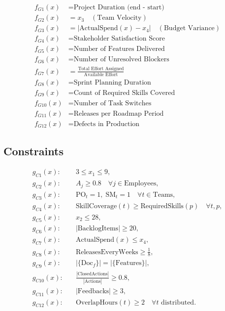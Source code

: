 \documentclass{article}
\begin{document}
\[
\begin{aligned}
f_{G1}(x) &= \text{Project Duration (end - start)}\\
f_{G2}(x) &= x_3 \quad(\text{Team Velocity})\\
f_{G3}(x) &= \bigl|\text{ActualSpend}(x) - x_4\bigr| \quad(\text{Budget Variance})\\
f_{G4}(x) &= \text{Stakeholder Satisfaction Score}\\
f_{G5}(x) &= \text{Number of Features Delivered}\\
f_{G6}(x) &= \text{Number of Unresolved Blockers}\\
f_{G7}(x) &= \frac{\text{Total Effort Assigned}}{\text{Available Effort}}\\
f_{G8}(x) &= \text{Sprint Planning Duration}\\
f_{G9}(x) &= \text{Count of Required Skills Covered}\\
f_{G10}(x) &= \text{Number of Task Switches}\\
f_{G11}(x) &= \text{Releases per Roadmap Period}\\
f_{G12}(x) &= \text{Defects in Production}
\end{aligned}
\]

\subsection*{Constraints}
\[
\begin{aligned}
g_{C1}(x):\quad &3 \le x_1 \le 9,\\
g_{C2}(x):\quad &A_j \ge 0.8 \quad \forall j\in\text{Employees},\\
g_{C3}(x):\quad &\text{PO}_t = 1,\;\text{SM}_t = 1 \quad \forall t\in\text{Teams},\\
g_{C4}(x):\quad &\text{SkillCoverage}(t) \ge \text{RequiredSkills}(p)\quad \forall t,p,\\
g_{C5}(x):\quad &x_2 \le 28,\\
g_{C6}(x):\quad &|\text{BacklogItems}| \ge 20,\\
g_{C7}(x):\quad &\text{ActualSpend}(x) \le x_4,\\
g_{C8}(x):\quad &\text{ReleasesEveryWeeks} \ge \tfrac{1}{8},\\
g_{C9}(x):\quad &|\{\text{Doc}_{f}\}| = |\{\text{Features}\}|,\\
g_{C10}(x):\quad &\frac{|\text{ClosedActions}|}{|\text{Actions}|} \ge 0.8,\\
g_{C11}(x):\quad &|\text{Feedbacks}| \ge 3,\\
g_{C12}(x):\quad &\text{OverlapHours}(t) \ge 2 \quad \forall t\text{ distributed}.
\end{aligned}
\]
\end{document}
